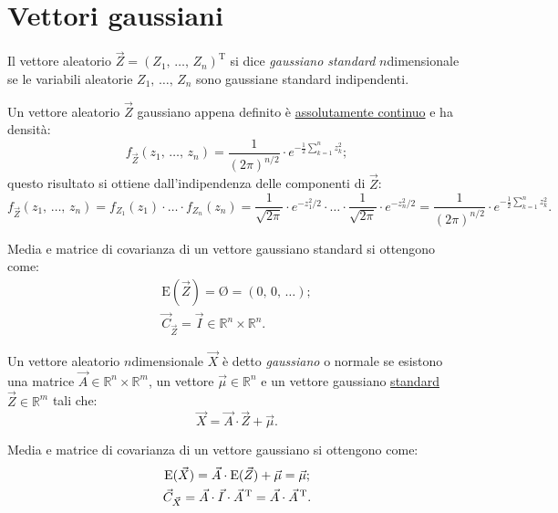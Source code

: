     \section{Vettori gaussiani}
        \begin{defn}\label{defn:Vettore_gaussiano_standard}
            Il vettore aleatorio $\vec{Z} = (Z_1,\, \ldots,\, Z_{n})^{\text{T}}$ si dice \emph{gaussiano standard} $n$\nbdash dimensionale se le variabili aleatorie $Z_1,\, \ldots,\, Z_{n}$ sono gaussiane standard indipendenti.

            Un vettore aleatorio $\vec{Z}$ gaussiano appena definito è \underline{assolutamente continuo} e ha densità: \[
                f_{\vec{Z}}(z_1,\, \ldots,\, z_{n}) = \frac{1}{(2\pi)^{n /2}} \cdot e^{-\frac{1}{2}\sum_{k=1}^{n} z_k^2}
            ;\] questo risultato si ottiene dall'indipendenza delle componenti di $\vec{Z}$: \[
            f_{\vec{Z}}(z_1,\, \ldots,\, z_{n}) = f_{Z_1}(z_1) \cdot \ldots \cdot f_{Z_n}(z_n) =
            \frac{1}{\sqrt{2\pi}} \cdot e^{- z_1^2 /2} \cdot \ldots \cdot \frac{1}{\sqrt{2\pi}} \cdot e^{- z_n^2 /2} = \frac{1}{(2\pi)^{n /2}} \cdot e^{-\frac{1}{2}\sum_{k=1}^{n} z_k^2}
            .\] 
        \end{defn}
        \begin{obsv}
            Media e matrice di covarianza di un vettore gaussiano standard si ottengono come:
            \begin{gather*}
                \text{E}(\vec{Z}) = \text{\O} = (0,\,0,\,\ldots); \\
                \vec{C}_{\vec{Z}} = \vec{I} \in \mathbb{R}^n \times \mathbb{R}^n.
            \end{gather*}
        \end{obsv}
        \begin{defn}[Normale]\label{defn:Vettore_gaussiano}
            Un vettore aleatorio $n$\nbdash dimensionale $\vec{X}$ è detto \emph{gaussiano} o normale se esistono una matrice $\vec{A} \in \mathbb{R}^n \times \mathbb{R}^m$, un vettore $\vec{\mu} \in \mathbb{R}^n$ e un vettore gaussiano \underline{standard} $\vec{Z} \in \mathbb{R}^m$ tali che: \[
            \vec{X} = \vec{A} \cdot \vec{Z} + \vec{\mu}
            .\] 
        \end{defn}
        \begin{obsv}\label{obsv:Vettore_gaussiano}
            Media e matrice di covarianza di un vettore gaussiano si ottengono come:
            \begin{gather*}
                \text{E}(\vec{X}) = \vec{A} \cdot \text{E}(\vec{Z}) + \vec{\mu} = \vec{\mu}; \\
                \vec{C}_{\vec{X}} = \vec{A} \cdot \vec{I} \cdot \vec{A}^{\text{\,T}} = \vec{A} \cdot \vec{A}^{\text{\,T}}.
            \end{gather*}
        \end{obsv}
